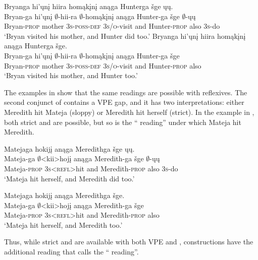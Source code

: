 \documentclass[output=paper]{LSP/langsci}
\begin{document}
 
\ea\label{ex:johnson:44}
\ea\label{ex:johnson:44a} 
\glll Bryanga hi'ųnį hiira homąkįnį anąga Hunterga šge ųų.\\
Bryan-ga hi'ųnį $\emptyset$-hii-ra $\emptyset$-homąkįnį anąga Hunter-ga šge {\db}$\emptyset$-ųų\\
Bryan-\textsc{prop} mother \textsc{3s-poss-def} \textsc{3s/o}-visit and Hunter-\textsc{prop} also {\db}\textsc{3s}-do\\
\trans `Bryan visited his mother, and Hunter did too.'
\ex\label{ex:johnson:44b}
\glll Bryanga hi'ųnį hiira homąkįnį anąga Hunterga šge.\\
Bryan-ga hi'ųnį $\emptyset$-hii-ra $\emptyset$-homąkįnį anąga Hunter-ga šge\\
Bryan-\textsc{prop} mother \textsc{3s-poss-def} \textsc{3s/o}-visit and Hunter-\textsc{prop} also\\
\trans `Bryan visited his mother, and Hunter too.'
\z
\z

The examples in  show that the same readings are possible with reflexives. The second conjunct of  contains a VPE gap, and it has two interpretations: either Meredith hit Mateja (sloppy) or Meredith hit herself (strict). In the  example in , both strict and  are possible, but so is the `` reading'' under which Mateja hit Meredith.
 
\ea\label{ex:johnson:45}
\ea\label{ex:johnson:45a} 
\glll Matejaga hokijį anąga Meredithga šge ųų.\\
Mateja-ga $\emptyset$<kii>hojį anąga Meredith-ga šge {\db}$\emptyset$-ųų\\
Mateja-\textsc{prop} \textsc{3s}<\textsc{refl}>hit and Meredith-\textsc{prop} also {\db}\textsc{3s}-do\\
\trans `Mateja hit herself, and Meredith did too.'

\ex\label{ex:johnson:45b}
\glll Matejaga hokijį anąga Meredithga šge.\\
Mateja-ga $\emptyset$<kii>hojį anąga Meredith-ga šge\\ 
Mateja-\textsc{prop} \textsc{3s}<\textsc{refl}>hit and Meredith-\textsc{prop} also\\ 
\trans `Mateja hit herself, and Meredith too.'
\z
\z

Thus, while strict and  are available with both VPE and ,  constructions have the additional reading that \citet{Fortin2007} calls the `` reading''.
\end{document}
